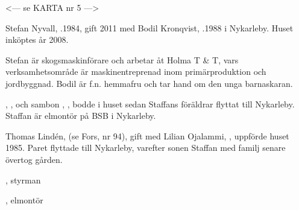 
<--- se KARTA nr 5 --->

%

%
Stefan Nyvall, .1984, gift 2011 med Bodil Kronqvist, .1988 i Nykarleby. Huset inköptes år 2008.

Stefan är skogsmaskinförare och arbetar åt Holma T \& T, vars verksamhetsområde är maskinentreprenad inom primärproduktion och jordbyggnad. Bodil är f.n. hemmafru och tar hand om den unga barnaskaran.
\begin{jhchildren}
  \item {}
  \item {}
  \item {}
\end{jhchildren}


, , och sambon , , bodde i huset sedan Staffans föräldrar flyttat till Nykarleby. Staffan är elmontör på BSB i Nykarleby.
\begin{jhchildren}
  \item {}
  \item {}
\end{jhchildren}


Thomas Lindén,  (se Fors, nr 94), gift med Lilian Ojalammi, , uppförde huset 1985. Paret flyttade till Nykarleby, varefter sonen Staffan med familj senare övertog gården.
\begin{jhchildren}
  \item {}, styrman
  \item {}, elmontör
  \item {}
  \item {}
\end{jhchildren}



